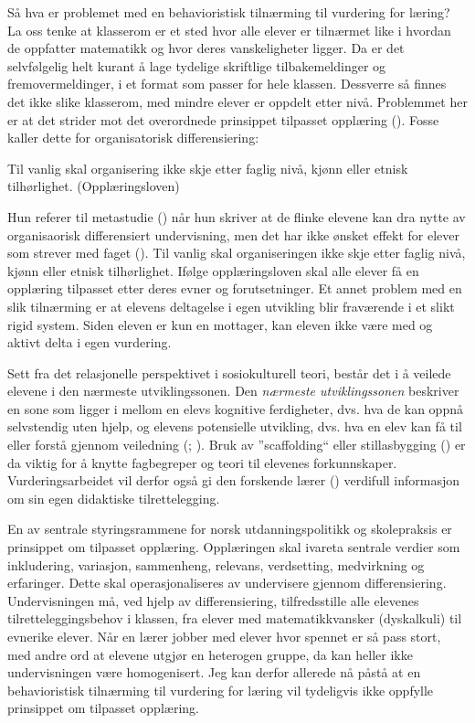 \documentclass[main.tex]{subfiles}
\begin{document}
Så hva er problemet med en behavioristisk tilnærming til vurdering for læring? La oss tenke at klasserom er 
et sted hvor alle elever er tilnærmet like i hvordan de oppfatter matematikk og hvor deres vanskeligheter ligger. 
Da er det selvfølgelig helt kurant å lage tydelige skriftlige tilbakemeldinger og fremovermeldinger, i et format 
som passer for hele klassen. Dessverre så finnes det ikke slike klasserom, med mindre elever er oppdelt etter nivå. 
Problemmet her er at det strider mot det overordnede prinsippet tilpasset opplæring (). 
Fosse kaller dette for organisatorisk differensiering:
\begin{displayquote}
\textelp{} Til vanlig skal organisering ikke skje etter faglig nivå, kjønn eller etnisk tilhørlighet. (Opplæringsloven)
\end{displayquote}
Hun referer til metastudie () når hun skriver at de flinke elevene kan dra nytte av organisaorisk
differensiert undervisning, men det har ikke ønsket effekt for elever som strever med faget (). 
Til vanlig skal organiseringen ikke skje etter faglig nivå, kjønn eller etnisk tilhørlighet. Ifølge opplæringsloven skal 
alle elever få en opplæring tilpasset etter deres evner og forutsetninger. Et annet problem med en slik tilnærming er at 
elevens deltagelse i egen utvikling blir fraværende i et slikt rigid system. Siden eleven er kun en mottager, kan eleven 
ikke være med og aktivt delta i egen vurdering. 

Sett fra det relasjonelle perspektivet i sosiokulturell teori, består det i å veilede elevene i den 
nærmeste utviklingssonen. Den \emph{nærmeste utviklingssonen} beskriver en sone som ligger i mellom en elevs kognitive 
ferdigheter, dvs. hva de kan oppnå selvstendig uten hjelp, og elevens potensielle utvikling, dvs. 
hva en elev kan få til eller forstå gjennom veiledning (; ). 
Bruk av ''scaffolding`` eller stillasbygging () er da viktig for å knytte fagbegreper og 
teori til elevenes forkunnskaper. Vurderingsarbeidet vil derfor også gi den forskende lærer () 
verdifull informasjon om sin egen didaktiske tilrettelegging.

En av sentrale styringsrammene for norsk utdanningspolitikk og skolepraksis er prinsippet om tilpasset opplæring.
Opplæringen skal ivareta sentrale verdier som inkludering, variasjon, sammenheng, relevans, verdsetting, medvirkning og 
erfaringer. Dette skal operasjonaliseres av undervisere gjennom differensiering.  Undervisningen må, ved hjelp av 
differensiering, tilfredsstille alle elevenes tilretteleggingsbehov i klassen, fra elever med matematikkvansker 
(dyskalkuli) til evnerike elever. Når en lærer jobber med elever hvor spennet er så pass stort, med andre ord at elevene 
utgjør en heterogen gruppe, da kan heller ikke undervisningen være homogenisert. Jeg kan derfor allerede nå påstå at en 
behavioristisk tilnærming til vurdering for læring vil tydeligvis ikke oppfylle prinsippet om tilpasset opplæring.
\end{document}
